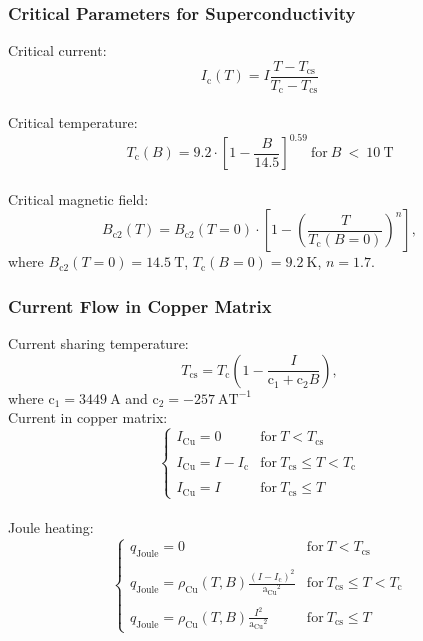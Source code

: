 
\subsubsection{Critical Parameters for Superconductivity}
Critical current:
\begin{equation}
    I_\text{c}(T) = I \frac{T-T_\text{cs}}{T_\text{c}-T_\text{cs}}
\end{equation}
\\
Critical temperature:
\begin{equation}
    T_\text{c}(B) = 9.2 \cdot [1- \frac{B}{14.5}]^{0.59}~\text{for}~B~<~10~\text{T}
\end{equation}
\\
Critical magnetic field: 
\begin{equation}
    B_\text{c2}(T) = B_\text{c2}(T=0) \cdot [1-(\frac{T}{T_\text{c}(B=0)})^{n}],
\end{equation}
where
$B_\text{c2}(T=0)=14.5~\text{T}$, $T_\text{c}(B=0)=9.2~\text{K}$, $n=1.7$.

\subsubsection{Current Flow in Copper Matrix}

Current sharing temperature: 
\begin{equation}
    T_\text{cs} = T_\text{c} (1 - \frac{I}{\text{c}_1 + \text{c}_2 B }),
\end{equation}
where $\text{c}_1=3449~\text{A}$ and $\text{c}_2=-257~\text{AT}^{-1}$
\\
Current in copper matrix: 
\begin{equation}
    \left\{ \begin{array}{lll}
    I_\text{Cu} = 0 & \text{for}~T < T_\text{cs} \\ \\
    I_\text{Cu} = I - I_\text{c} & \text{for}~T_\text{cs} \leq T<T_\text{c}  \\ \\
    I_\text{Cu} = I & \text{for}~T_\text{cs} \leq T
    \end{array} \right.
\end{equation}
\\
Joule heating: 
\begin{equation}
    \left\{ \begin{array}{lll}
    q_\text{Joule} = 0 & \text{for}~T < T_\text{cs} \\ \\
    q_\text{Joule} = \rho_\text{Cu}(T, B) \frac{(I-I_\text{c})^2}{{\text{a}_\text{Cu}}^2}& \text{for}~T_\text{cs} \leq T<T_\text{c}  \\ \\
    q_\text{Joule} = \rho_\text{Cu}(T, B) \frac{I^2}{{\text{a}_\text{Cu}}^2} & \text{for}~T_\text{cs} \leq T
    \end{array} \right.
\end{equation}


